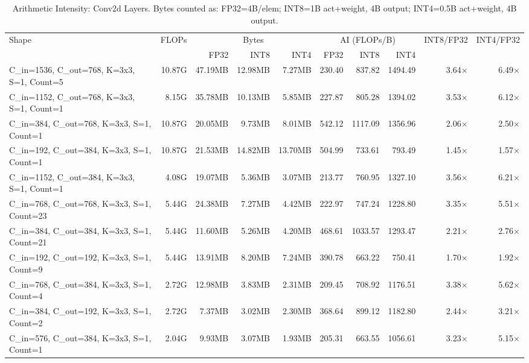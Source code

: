 \begin{table}[h]
  \centering
  \caption{Arithmetic Intensity: Conv2d Layers. Bytes counted as: FP32=4B/elem; INT8=1B act+weight, 4B output; INT4=0.5B act+weight, 4B output.}
  \label{tab:ai_conv2d}
  \begin{tabular}{lrrrrrrrrr}
    \toprule
    Shape & FLOPs & \multicolumn{3}{c}{Bytes} & \multicolumn{3}{c}{AI (FLOPs/B)} & INT8/FP32 & INT4/FP32 \\
    \cmidrule(lr){3-5}\cmidrule(lr){6-8}
    & & FP32 & INT8 & INT4 & FP32 & INT8 & INT4 & & \\
    \midrule
    C\_in=1536, C\_out=768, K=3x3, S=1, Count=5 & 10.87G & 47.19MB & 12.98MB & 7.27MB & 230.40 & 837.82 & 1494.49 & 3.64$\times$ & 6.49$\times$ \\
    C\_in=1152, C\_out=768, K=3x3, S=1, Count=1 & 8.15G & 35.78MB & 10.13MB & 5.85MB & 227.87 & 805.28 & 1394.02 & 3.53$\times$ & 6.12$\times$ \\
    C\_in=384, C\_out=768, K=3x3, S=1, Count=1 & 10.87G & 20.05MB & 9.73MB & 8.01MB & 542.12 & 1117.09 & 1356.96 & 2.06$\times$ & 2.50$\times$ \\
    C\_in=192, C\_out=384, K=3x3, S=1, Count=1 & 10.87G & 21.53MB & 14.82MB & 13.70MB & 504.99 & 733.61 & 793.49 & 1.45$\times$ & 1.57$\times$ \\
    C\_in=1152, C\_out=384, K=3x3, S=1, Count=1 & 4.08G & 19.07MB & 5.36MB & 3.07MB & 213.77 & 760.95 & 1327.10 & 3.56$\times$ & 6.21$\times$ \\
    C\_in=768, C\_out=768, K=3x3, S=1, Count=23 & 5.44G & 24.38MB & 7.27MB & 4.42MB & 222.97 & 747.24 & 1228.80 & 3.35$\times$ & 5.51$\times$ \\
    C\_in=384, C\_out=384, K=3x3, S=1, Count=21 & 5.44G & 11.60MB & 5.26MB & 4.20MB & 468.61 & 1033.57 & 1293.47 & 2.21$\times$ & 2.76$\times$ \\
    C\_in=192, C\_out=192, K=3x3, S=1, Count=9 & 5.44G & 13.91MB & 8.20MB & 7.24MB & 390.78 & 663.22 & 750.41 & 1.70$\times$ & 1.92$\times$ \\
    C\_in=768, C\_out=384, K=3x3, S=1, Count=4 & 2.72G & 12.98MB & 3.83MB & 2.31MB & 209.45 & 708.92 & 1176.51 & 3.38$\times$ & 5.62$\times$ \\
    C\_in=384, C\_out=192, K=3x3, S=1, Count=2 & 2.72G & 7.37MB & 3.02MB & 2.30MB & 368.64 & 899.12 & 1182.80 & 2.44$\times$ & 3.21$\times$ \\
    C\_in=576, C\_out=384, K=3x3, S=1, Count=1 & 2.04G & 9.93MB & 3.07MB & 1.93MB & 205.31 & 663.55 & 1056.61 & 3.23$\times$ & 5.15$\times$ \\

\end{tabular}
\end{table}
